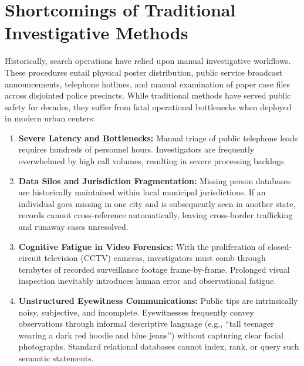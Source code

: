 \documentclass[12pt,a4paper]{report}
\begin{document}
\section{Shortcomings of Traditional Investigative Methods}
Historically, search operations have relied upon manual investigative workflows. These procedures entail physical poster distribution, public service broadcast announcements, telephone hotlines, and manual examination of paper case files across disjointed police precincts. While traditional methods have served public safety for decades, they suffer from fatal operational bottlenecks when deployed in modern urban centers:
\begin{enumerate}
    \item \textbf{Severe Latency and Bottlenecks:} Manual triage of public telephone leads requires hundreds of personnel hours. Investigators are frequently overwhelmed by high call volumes, resulting in severe processing backlogs.
    \item \textbf{Data Silos and Jurisdiction Fragmentation:} Missing person databases are historically maintained within local municipal jurisdictions. If an individual goes missing in one city and is subsequently seen in another state, records cannot cross-reference automatically, leaving cross-border trafficking and runaway cases unresolved.
    \item \textbf{Cognitive Fatigue in Video Forensics:} With the proliferation of closed-circuit television (CCTV) cameras, investigators must comb through terabytes of recorded surveillance footage frame-by-frame. Prolonged visual inspection inevitably introduces human error and observational fatigue.
    \item \textbf{Unstructured Eyewitness Communications:} Public tips are intrinsically noisy, subjective, and incomplete. Eyewitnesses frequently convey observations through informal descriptive language (e.g., ``tall teenager wearing a dark red hoodie and blue jeans'') without capturing clear facial photographs. Standard relational databases cannot index, rank, or query such semantic statements.
\end{enumerate}
\end{document}

